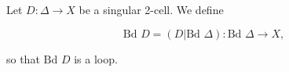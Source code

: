 Let $D: \Delta \rightarrow X$ be a singular 2-cell. We define

$$\text{Bd } D = (D | \text{Bd } \Delta): \text{Bd } \Delta \rightarrow X,$$

so that $\text{Bd } D$ is a loop.
